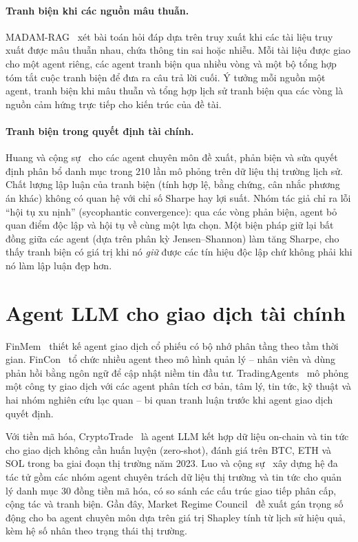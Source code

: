 \paragraph{Tranh biện khi các nguồn mâu thuẫn.}
MADAM-RAG~\cite{wang2025madamrag} xét bài toán hỏi đáp dựa trên truy xuất khi các tài liệu truy xuất được mâu thuẫn
nhau, chứa thông tin sai hoặc nhiễu. Mỗi tài liệu được giao cho một agent riêng, các agent tranh biện qua nhiều vòng
và một bộ tổng hợp tóm tắt cuộc tranh biện để đưa ra câu trả lời cuối. Ý tưởng mỗi nguồn một agent, tranh biện khi
mâu thuẫn và tổng hợp lịch sử tranh biện qua các vòng là nguồn cảm hứng trực tiếp cho kiến trúc của đề tài.

\paragraph{Tranh biện trong quyết định tài chính.}
Huang và cộng sự~\cite{huang2026debate} cho các agent chuyên môn đề xuất, phản biện và sửa quyết định phân bổ danh mục
trong 210 lần mô phỏng trên dữ liệu thị trường lịch sử. Chất lượng lập luận của tranh biện (tính hợp lệ, bằng chứng,
cân nhắc phương án khác) không có quan hệ với chỉ số Sharpe hay lợi suất. Nhóm tác giả chỉ ra lỗi ``hội tụ xu nịnh''
(sycophantic convergence): qua các vòng phản biện, agent bỏ quan điểm độc lập và hội tụ về cùng một lựa chọn. Một biện
pháp giữ lại bất đồng giữa các agent (dựa trên phân kỳ Jensen--Shannon) làm tăng Sharpe, cho thấy tranh biện có giá trị
khi nó \emph{giữ} được các tín hiệu độc lập chứ không phải khi nó làm lập luận đẹp hơn.

\section{Agent LLM cho giao dịch tài chính}
FinMem~\cite{yu2023finmem} thiết kế agent giao dịch cổ phiếu có bộ nhớ phân tầng theo tầm thời gian. FinCon~\cite{yu2024fincon}
tổ chức nhiều agent theo mô hình quản lý -- nhân viên và dùng phản hồi bằng ngôn ngữ để cập nhật niềm tin đầu tư.
TradingAgents~\cite{xiao2024tradingagents} mô phỏng một công ty giao dịch với các agent phân tích cơ bản, tâm lý, tin
tức, kỹ thuật và hai nhóm nghiên cứu lạc quan -- bi quan tranh luận trước khi agent giao dịch quyết định.

Với tiền mã hóa, CryptoTrade~\cite{li2024cryptotrade} là agent LLM kết hợp dữ liệu on-chain và tin tức cho giao dịch
không cần huấn luyện (zero-shot), đánh giá trên BTC, ETH và SOL trong ba giai đoạn thị trường năm 2023. Luo và
cộng sự~\cite{luo2025cryptomas} xây dựng hệ đa tác tử gồm các nhóm agent chuyên trách dữ liệu thị trường và tin tức cho
quản lý danh mục 30 đồng tiền mã hóa, có so sánh các cấu trúc giao tiếp phân cấp, cộng tác và tranh biện. Gần đây,
Market Regime Council~\cite{mrc2026} đề xuất gán trọng số động cho ba agent chuyên môn dựa trên giá trị Shapley tính từ
lịch sử hiệu quả, kèm hệ số nhân theo trạng thái thị trường.

